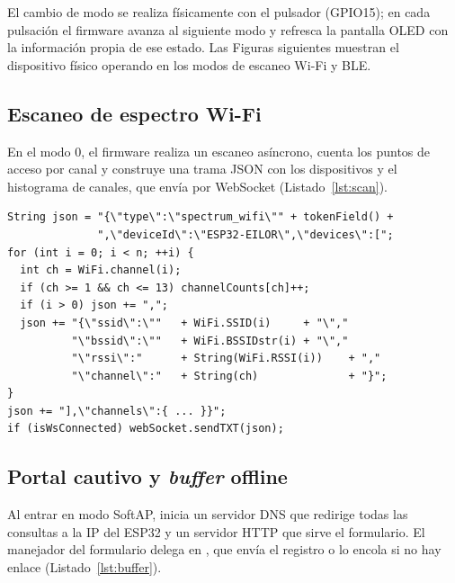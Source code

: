 El cambio de modo se realiza físicamente con el pulsador (GPIO15); en cada
pulsación el firmware avanza al siguiente modo y refresca la pantalla OLED con la
información propia de ese estado. Las Figuras siguientes muestran el dispositivo
físico operando en los modos de escaneo Wi\nobreakdash-Fi y BLE.



\subsection{Escaneo de espectro Wi-Fi}
En el modo 0, el firmware realiza un escaneo asíncrono, cuenta los puntos de acceso por canal y construye una trama JSON con los dispositivos y el histograma de canales, que envía por WebSocket (Listado~\ref{lst:scan}).

\begin{lstlisting}[style=cpp,caption={Escaneo y serialización del espectro Wi-Fi},label={lst:scan}]
String json = "{\"type\":\"spectrum_wifi\"" + tokenField() +
              ",\"deviceId\":\"ESP32-EILOR\",\"devices\":[";
for (int i = 0; i < n; ++i) {
  int ch = WiFi.channel(i);
  if (ch >= 1 && ch <= 13) channelCounts[ch]++;
  if (i > 0) json += ",";
  json += "{\"ssid\":\""   + WiFi.SSID(i)     + "\","
          "\"bssid\":\""   + WiFi.BSSIDstr(i) + "\","
          "\"rssi\":"      + String(WiFi.RSSI(i))    + ","
          "\"channel\":"   + String(ch)              + "}";
}
json += "],\"channels\":{ ... }}";
if (isWsConnected) webSocket.sendTXT(json);
\end{lstlisting}

\subsection{Portal cautivo y \emph{buffer} offline}
Al entrar en modo SoftAP,  inicia un servidor DNS que redirige todas las consultas a la IP del ESP32 y un servidor HTTP que sirve el formulario. El manejador del formulario delega en , que envía el registro o lo encola si no hay enlace (Listado~\ref{lst:buffer}).

